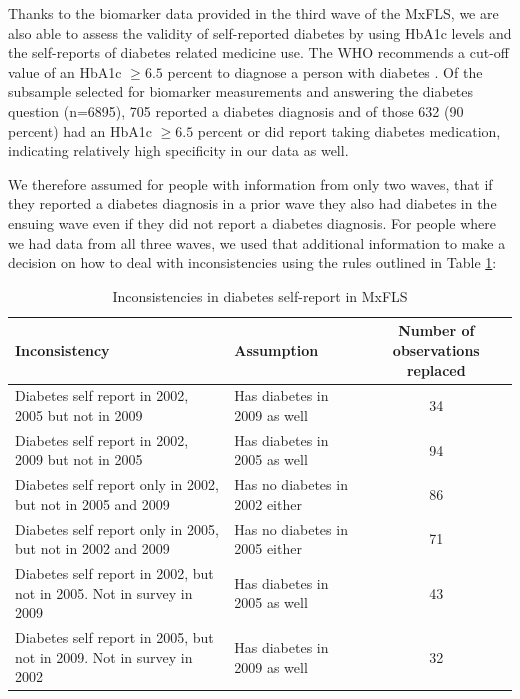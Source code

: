 \documentclass[12pt,english,british]{article}
\providecommand{\tabularnewline}{\\}
\begin{document}
\begin{appendix}
Thanks to the biomarker data provided in the third wave of the \ac{MxFLS},
we are also able to assess the validity of self-reported diabetes
by using \ac{HbA1c} levels and the self-reports of diabetes
related medicine use. The \ac{WHO}
recommends a cut-off value of an \ac{HbA1c} $\geq6.5$ percent
to diagnose a person with diabetes \citep{WorldHealthOrganization2011}.
Of the subsample selected for biomarker measurements and answering
the diabetes question (n=6895), 705 reported a diabetes diagnosis
and of those 632 (90 percent) had an \ac{HbA1c} $\geq6.5$ percent
or did report taking diabetes medication, indicating relatively high specificity in our data as well.

We therefore assumed for people with information from only two waves, that if
they reported a diabetes diagnosis in a prior wave they also had diabetes
in the ensuing wave even if they did not report a diabetes diagnosis.
For people where we had data from all three waves, we used that
additional information to make a decision on how to deal with inconsistencies
using the rules outlined in Table \ref{tab:Inconsistencies}:

\begin{table}[h!]
\caption{\label{tab:Inconsistencies}Inconsistencies in diabetes self-report in MxFLS}
\begin{center}
\begin{adjustbox}{max width=\textwidth}
\begin{tabular}{llc}
\hline 
Inconsistency  & Assumption  & Number of observations replaced\tabularnewline
\hline 
Diabetes self report in 2002, 2005 but not in 2009  & Has diabetes in 2009 as well  & 34\tabularnewline
Diabetes self report in 2002, 2009 but not in 2005  & Has diabetes in 2005 as well  & 94\tabularnewline
Diabetes self report only in 2002, but not in 2005 and 2009  & Has no diabetes in 2002 either  & 86\tabularnewline
Diabetes self report only in 2005, but not in 2002 and 2009  & Has no diabetes in 2005 either  & 71\tabularnewline
Diabetes self report in 2002, but not in 2005. Not in survey in 2009  & Has diabetes in 2005 as well  & 43\tabularnewline
Diabetes self report in 2005, but not in 2009. Not in survey in 2002  & Has diabetes in 2009 as well  & 32\tabularnewline
\end{tabular}
\end{adjustbox}
\end{center}
\end{table}



\end{appendix}
\end{document}
